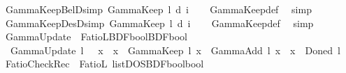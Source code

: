 \begin{isabellebody}
\endisatagproof
{\isafoldproof}%
%
\isadelimproof
%
\endisadelimproof
\isanewline
{}\isamarkupfalse%
\ GammaKeep{\isacharunderscore}{\kern0pt}BelD{\isacharbrackleft}{\kern0pt}simp{\isacharbrackright}{\kern0pt}{\isacharcolon}{\kern0pt}\ {\isachardoublequoteopen}GammaKeep\ l\ {\isacharparenleft}{\kern0pt}{\isasymB}\isactrlsup d\ i\ {\isasymphi}{\isacharparenright}{\kern0pt}{\isachardoublequoteclose}%
\isadelimproof
\ %
\endisadelimproof
%
\isatagproof
{}\isamarkupfalse%
\ GammaKeep{\isacharunderscore}{\kern0pt}def\ \isamarkupfalse%
\ simp%
\endisatagproof
{\isafoldproof}%
%
\isadelimproof
%
\endisadelimproof
\isanewline
{}\isamarkupfalse%
\ GammaKeep{\isacharunderscore}{\kern0pt}DesD{\isacharbrackleft}{\kern0pt}simp{\isacharbrackright}{\kern0pt}{\isacharcolon}{\kern0pt}\ {\isachardoublequoteopen}GammaKeep\ l\ {\isacharparenleft}{\kern0pt}{\isasymD}\isactrlsup d\ i\ {\isasymphi}{\isacharparenright}{\kern0pt}{\isachardoublequoteclose}%
\isadelimproof
\ %
\endisadelimproof
%
\isatagproof
{}\isamarkupfalse%
\ GammaKeep{\isacharunderscore}{\kern0pt}def\ \isamarkupfalse%
\ simp%
\endisatagproof
{\isafoldproof}%
%
\isadelimproof
%
\endisadelimproof
\isanewline
\isanewline
{}\isamarkupfalse%
\ GammaUpdate\ {\isacharcolon}{\kern0pt}{\isacharcolon}{\kern0pt}\ {\isachardoublequoteopen}FatioL{\isasymRightarrow}{\isacharparenleft}{\kern0pt}BDF{\isasymRightarrow}bool{\isacharparenright}{\kern0pt}{\isasymRightarrow}{\isacharparenleft}{\kern0pt}BDF{\isasymRightarrow}bool{\isacharparenright}{\kern0pt}{\isachardoublequoteclose}\ \isanewline
\ \ {\isachardoublequoteopen}GammaUpdate\ l\ {\isasymGamma}\ {\isasymequiv}\ {\isasymlambda}x{\isachardot}{\kern0pt}\ {\isacharparenleft}{\kern0pt}{\isasymGamma}\ x\ {\isasymand}\ GammaKeep\ l\ x{\isacharparenright}{\kern0pt}\ {\isasymor}\ GammaAdd\ l\ x\ {\isasymor}\ x\ {\isacharequal}{\kern0pt}\ Done\isactrlsup d\ l{\isachardoublequoteclose}\isanewline
\isanewline
%
\isanewline
{}\isamarkupfalse%
\ FatioCheckRec\ {\isacharcolon}{\kern0pt}{\isacharcolon}{\kern0pt}\ {\isachardoublequoteopen}FatioL\ list{\isasymRightarrow}DOS{\isasymRightarrow}{\isacharparenleft}{\kern0pt}BDF{\isasymRightarrow}bool{\isacharparenright}{\kern0pt}{\isasymRightarrow}bool{\isachardoublequoteclose}\ \isanewline

\end{isabellebody}
